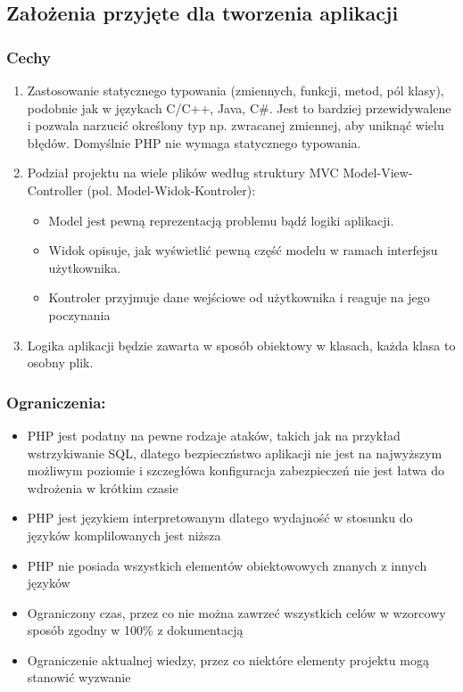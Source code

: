 \pagebreak

\subsection{Założenia przyjęte dla tworzenia aplikacji}

\subsubsection{Cechy}
\begin{enumerate}
    \item Zastosowanie statycznego typowania (zmiennych, funkcji, metod, pól klasy), podobnie jak w językach C/C++, Java, C\#. Jest to bardziej przewidywalene i pozwala narzucić określony typ np. zwracanej zmiennej, aby uniknąć wielu błędów. Domyślnie PHP nie wymaga statycznego typowania.
    \item Podział projektu na wiele plików według struktury MVC Model-View-Controller (pol. Model-Widok-Kontroler):
        \begin{itemize}
            \item Model jest pewną reprezentacją problemu bądź logiki aplikacji.
            \item Widok opisuje, jak wyświetlić pewną część modelu w ramach interfejsu użytkownika. 
            \item Kontroler przyjmuje dane wejściowe od użytkownika i reaguje na jego poczynania
        \end{itemize}
    \item Logika aplikacji będzie zawarta w sposób obiektowy w klasach, każda klasa to osobny  plik.
\end{enumerate}

\subsubsection{Ograniczenia:}
\begin{itemize}
    \item PHP jest podatny na pewne rodzaje ataków, takich jak na przykład wstrzykiwanie SQL, dlatego bezpieczństwo aplikacji nie jest na najwyższym możliwym poziomie i szczegłówa konfiguracja zabezpieczeń nie jest łatwa do wdrożenia w krótkim czasie
    \item PHP jest językiem interpretowanym dlatego wydajność w stosunku do języków komplilowanych jest niższa
    \item PHP nie posiada wszystkich elementów obiektowowych znanych z innych języków
    \item Ograniczony czas, przez co nie można zawrzeć wszystkich celów w wzorcowy sposób zgodny w 100\% z dokumentacją
    \item Ograniczenie aktualnej wiedzy, przez co niektóre elementy projektu mogą stanowić wyzwanie
\end{itemize}

